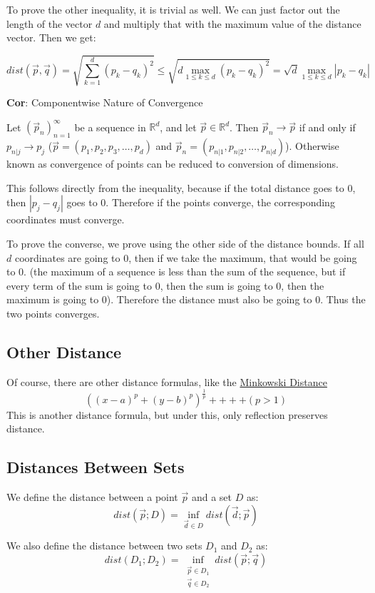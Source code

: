 \documentclass[11 pt, twoside]{article}
\begin{document}
To prove the other inequality, it is trivial as well. We can just factor out the
length of the vector $d$ and multiply that with the maximum value of the
distance vector. Then we get:

$$dist(\vec{p}, \vec{q}) = \sqrt{\sum_{k = 1}^d (p_k - q_k)^2} \leq \sqrt{d \max_{1 \leq k \leq d} (p_k -
q_k)^2} = \sqrt{d} \max_{1 \leq k \leq
d} |p_k - q_k|$$

\textbf{Cor}: Componentwise Nature of Convergence

Let $(\vec{p}_n)_{n = 1}^\infty$ be a sequence in $\mathbb{R}^d$, and let
$\vec{p} \in \mathbb{R}^d$. Then $\vec{p}_n \to \vec{p}$ if and only if
$p_{n|j} \to p_j$ ($\vec{p} = (p_1, p_2, p_3, \dots, p_d)$ and $\vec{p}_n =
(p_{n|1}, p_{n|2}, \dots, p_{n|d})$). Otherwise known as convergence of points
can be reduced to conversion of dimensions.

This follows directly from the inequality, because if the total distance goes to
0, then $|p_j - q_j|$ goes to 0. Therefore if the points converge, the
corresponding coordinates must converge.

To prove the converse, we prove using the other side of the distance bounds. If
all $d$ coordinates are going to 0, then if we take the maximum, that would be
going to 0. (the maximum of a sequence is less than the sum of the sequence, but
if every term of the sum is going to 0, then the sum is going to 0, then the
maximum is going to 0). Therefore the distance must also be going to 0. Thus the two points converges.

\subsection{Other Distance}
Of course, there are other distance formulas, like the \underline{Minkowski Distance}
$$((x - a)^p + (y - b)^p)^{\frac{1}{p}} ++++ (p > 1)$$
This is another distance formula, but under this, only reflection preserves
distance.

\subsection{Distances Between Sets}

We define the distance between a point $\vec{p}$ and a set $D$ as: $$dist(\vec{p}; D) = \inf_{\vec{d} \in D} dist(\vec{d} ; \vec{p})$$

We also define the distance between two sets $D_1$ and $D_2$ as: $$dist(D_1 ; D_2) = \inf_{\substack{\vec{p} \in D_1\\\vec{q} \in D_2}} dist(\vec{p} ; \vec{q})$$
\end{document}
